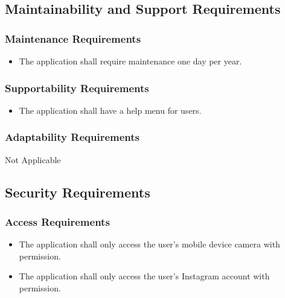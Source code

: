 \documentclass[]{article}
\begin{document}


\subsection{Maintainability and Support Requirements}
\label{sub:maintainability_and_support_requirements}

\subsubsection{Maintenance Requirements}
\label{ssub:maintenance_requirements}
\begin{itemize}
		
	    \item The application shall require maintenance one day per year. 
        	    
\end{itemize}

\subsubsection{Supportability Requirements}
\label{ssub:supportability_requirements}
\begin{itemize}
	\item The application shall have a help menu for users.
\end{itemize}

\subsubsection{Adaptability Requirements}
\label{ssub:adaptability_requirements}
Not Applicable


\subsection{Security Requirements}
\label{sub:security_requirements}

\subsubsection{Access Requirements}
\label{ssub:access_requirements}
\begin{itemize}
	\item The application shall only access the user's mobile device camera with permission. 
	\item The application shall only access the user's Instagram account with permission. 
\end{itemize}
\end{document}
